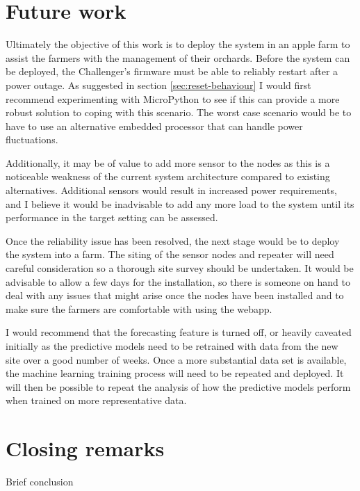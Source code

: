\section{Future work}

Ultimately the objective of this work is to deploy the system in an apple farm
to assist the farmers with the management of their orchards. Before the system
can be deployed, the Challenger's firmware must be able to reliably restart
after a power outage.  As suggested in section \ref{sec:reset-behaviour} I would
first recommend experimenting with MicroPython to see if this can provide a more
robust solution to coping with this scenario. The worst case scenario would be
to have to use an alternative embedded processor that can handle power
fluctuations.

Additionally, it may be of value to add more sensor to the nodes as this is a
noticeable weakness of the current system architecture compared to existing alternatives.
Additional sensors would result in increased power requirements, and I believe
it would be inadvisable to add any more load to the system until its performance
in the target setting can be assessed.

Once the reliability issue has been resolved, the next stage would be to deploy
the system into a farm.  The siting of the sensor nodes and repeater will need
careful consideration so a thorough site survey should be undertaken. It would
be advisable to allow a few days for the installation, so there is someone on
hand to deal with any issues that might arise once the nodes have been installed
and to make sure the farmers are comfortable with using the webapp.

I would recommend that the forecasting feature is turned off, or heavily
caveated initially as the predictive models need to be retrained with data from
the new site over a good number of weeks.  Once a more substantial data set is
available, the machine learning training process will need to be repeated and
deployed.  It will then be possible to repeat the analysis of how the predictive
models perform when trained on more representative data.


\section{Closing remarks}

Brief conclusion